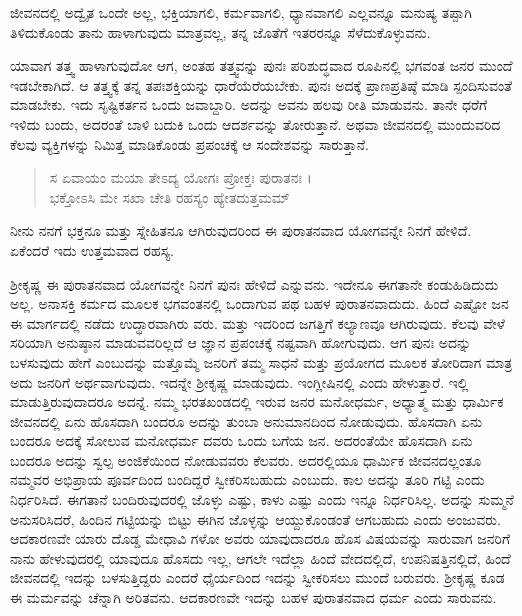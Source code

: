 ಜೀವನದಲ್ಲಿ ಅದ್ವೈತ ಒಂದೇ ಅಲ್ಲ, ಭಕ್ತಿಯಾಗಲಿ, ಕರ್ಮವಾಗಲಿ, ಧ್ಯಾನವಾಗಲಿ ಎಲ್ಲವನ್ನೂ ಮನುಷ್ಯ ತಪ್ಪಾಗಿ ತಿಳಿದುಕೊಂಡು ತಾನು ಹಾಳಾಗುವುದು ಮಾತ್ರವಲ್ಲ, ತನ್ನ ಜೊತೆಗೆ ಇತರರನ್ನೂ ಸೆಳೆದುಕೊಳ್ಳುವನು.

ಯಾವಾಗ ತತ್ತ್ವ ಹಾಳಾಗುವುದೋ ಆಗ, ಅಂತಹ ತತ್ತ್ವವನ್ನು ಪುನಃ ಪರಿಶುದ್ಧವಾದ ರೂಪಿನಲ್ಲಿ ಭಗವಂತ ಜನರ ಮುಂದೆ ಇಡಬೇಕಾಗಿದೆ. ಆ ತತ್ತ್ವಕ್ಕೆ ತನ್ನ ತಪಃಶಕ್ತಿಯನ್ನು ಧಾರೆಯೆರೆಯಬೇಕು. ಪುನಃ ಅದಕ್ಕೆ ಪ್ರಾಣಪ್ರತಿಷ್ಠೆ ಮಾಡಿ ಸ್ಪಂದಿಸುವಂತೆ ಮಾಡಬೇಕು. ಇದು ಸೃಷ್ಟಿಕರ್ತನ ಒಂದು ಜವಾಬ್ದಾರಿ. ಅದನ್ನು ಅವನು ಹಲವು ರೀತಿ ಮಾಡುವನು. ತಾನೇ ಧರೆಗೆ ಇಳಿದು ಬಂದು, ಅದರಂತೆ ಬಾಳಿ ಬದುಕಿ ಒಂದು ಆದರ್ಶವನ್ನು ತೋರುತ್ತಾನೆ. ಅಥವಾ ಜೀವನದಲ್ಲಿ ಮುಂದುವರಿದ ಕೆಲವು ವ್ಯಕ್ತಿಗಳನ್ನು ನಿಮಿತ್ತ ಮಾಡಿಕೊಂಡು ಪ್ರಪಂಚಕ್ಕೆ ಆ ಸಂದೇಶವನ್ನು ಸಾರುತ್ತಾನೆ.

\begin{verse}
ಸ ಏವಾಯಂ ಮಯಾ ತೇಽದ್ಯ ಯೋಗಃ ಪ್ರೋಕ್ತಃ ಪುರಾತನಃ ।\\ಭಕ್ತೋಽಸಿ ಮೇ ಸಖಾ ಚೇತಿ ರಹಸ್ಯಂ ಹ್ಯೇತದುತ್ತಮಮ್ 
\end{verse}

{\small ನೀನು ನನಗೆ ಭಕ್ತನೂ ಮತ್ತು ಸ್ನೇಹಿತನೂ ಆಗಿರುವುದರಿಂದ ಈ ಪುರಾತನವಾದ ಯೋಗವನ್ನೇ ನಿನಗೆ ಹೇಳಿದೆ. ಏಕೆಂದರೆ ಇದು ಉತ್ತಮವಾದ ರಹಸ್ಯ.}

ಶ್ರೀಕೃಷ್ಣ ಈ ಪುರಾತನವಾದ ಯೋಗವನ್ನೇ ನಿನಗೆ ಪುನಃ ಹೇಳಿದೆ ಎನ್ನುವನು. ಇದೇನೂ ಈಗತಾನೇ ಕಂಡುಹಿಡಿದುದು ಅಲ್ಲ. ಅನಾಸಕ್ತಿ ಕರ್ಮದ ಮೂಲಕ ಭಗವಂತನಲ್ಲಿ ಒಂದಾಗುವ ಪಥ ಬಹಳ ಪುರಾತನವಾದುದು. ಹಿಂದೆ ಎಷ್ಟೋ ಜನ ಈ ಮಾರ್ಗದಲ್ಲಿ ನಡೆದು ಉದ್ಧಾರವಾಗಿರು ವರು. ಮತ್ತು ಇದರಿಂದ ಜಗತ್ತಿಗೆ ಕಲ್ಯಾಣವೂ ಆಗಿರುವುದು. ಕೆಲವು ವೇಳೆ ಸರಿಯಾಗಿ ಅನುಷ್ಠಾನ ಮಾಡುವವರಿಲ್ಲದೆ ಆ ಜ್ಞಾನ ಪ್ರಪಂಚಕ್ಕೆ ನಷ್ಟವಾಗಿ ಹೋಗುವುದು. ಆಗ ಪುನಃ ಅದನ್ನು ಬಳಸುವುದು ಹೇಗೆ ಎಂಬುದನ್ನು ಮತ್ತೊಮ್ಮೆ ಜನರಿಗೆ ತಮ್ಮ ಸಾಧನೆ ಮತ್ತು ಪ್ರಯೋಗದ ಮೂಲಕ ತೋರಿದಾಗ ಮಾತ್ರ ಅದು ಜನರಿಗೆ ಅರ್ಥವಾಗುವುದು. ಇದನ್ನೇ ಶ್ರೀಕೃಷ್ಣ ಮಾಡುವುದು. ಇಂಗ್ಲೀಷಿನಲ್ಲಿ  ಎಂದು ಹೇಳುತ್ತಾರೆ. ಇಲ್ಲಿ ಮಾಡುತ್ತಿರುವುದಾದರೂ ಅದನ್ನೆ. ನಮ್ಮ ಭರತಖಂಡದಲ್ಲಿ ಇರುವ ಜನರ ಮನೋಧರ್ಮ, ಅಧ್ಯಾತ್ಮ ಮತ್ತು ಧಾರ್ಮಿಕ ಜೀವನದಲ್ಲಿ ಏನು ಹೊಸದಾಗಿ ಬಂದರೂ ಅದನ್ನು ತುಂಬಾ ಅನುಮಾನದಿಂದ ನೋಡುವುದು. ಹೊಸದಾಗಿ ಏನು ಬಂದರೂ ಅದಕ್ಕೆ ಸೋಲುವ ಮನೋಧರ್ಮ ದವರು ಒಂದು ಬಗೆಯ ಜನ. ಅದರಂತೆಯೇ ಹೊಸದಾಗಿ ಏನು ಬಂದರೂ ಅದನ್ನು ಸ್ವಲ್ಪ ಅಂಜಿಕೆಯಿಂದ ನೋಡುವವರು ಕೆಲವರು. ಅದರಲ್ಲಿಯೂ ಧಾರ್ಮಿಕ ಜೀವನದಲ್ಲಂತೂ ನಮ್ಮವರ ಅಭಿಪ್ರಾಯ ಪೂರ್ವದಿಂದ ಬಂದಿದ್ದರೆ ಸ್ವೀಕರಿಸಬಹುದು ಎಂಬುದು. ಕಾಲ ಅದನ್ನು ತೂರಿ ಗಟ್ಟಿ ಎಂದು ನಿರ್ಧರಿಸಿದೆ. ಈಗತಾನೆ ಬಂದಿರುವುದರಲ್ಲಿ ಜೊಳ್ಳು ಎಷ್ಟು, ಕಾಳು ಎಷ್ಟು ಎಂದು ಇನ್ನೂ ನಿರ್ಧರಿಸಿಲ್ಲ. ಅದನ್ನು ಸುಮ್ಮನೆ ಅನುಸರಿಸಿದರೆ, ಹಿಂದಿನ ಗಟ್ಟಿಯನ್ನು ಬಿಟ್ಟು ಈಗಿನ ಜೊಳ್ಳನ್ನು ಆಯ್ದುಕೊಂಡಂತೆ ಆಗಬಹುದು ಎಂದು ಅಂಜುವರು. ಆದಕಾರಣವೇ ಯಾರು ದೊಡ್ಡ ಮೇಧಾವಿ ಗಳೋ ಅವರು ಯಾವುದಾದರೂ ಹೊಸ ವಿಷಯವನ್ನು ಸಾರುವಾಗ ಜನರಿಗೆ ನಾನು ಹೇಳುವುದರಲ್ಲಿ ಯಾವುದೂ ಹೊಸದು ಇಲ್ಲ, ಆಗಲೇ ಇದೆಲ್ಲಾ ಹಿಂದೆ ವೇದದಲ್ಲಿದೆ, ಉಪನಿಷತ್ತಿನಲ್ಲಿದೆ, ಹಿಂದೆ ಜೀವನದಲ್ಲಿ ಇದನ್ನು ಬಳಸುತ್ತಿದ್ದರು ಎಂದರೆ ಧೈರ್ಯದಿಂದ ಇದನ್ನು ಸ್ವೀಕರಿಸಲು ಮುಂದೆ ಬರುವರು. ಶ್ರೀಕೃಷ್ಣ ಕೂಡ ಈ ಮರ್ಮವನ್ನು ಚೆನ್ನಾಗಿ ಅರಿತವನು. ಆದಕಾರಣವೇ ಇದನ್ನು ಬಹಳ ಪುರಾತನವಾದ ಧರ್ಮ ಎಂದು ಸಾರುವನು.

